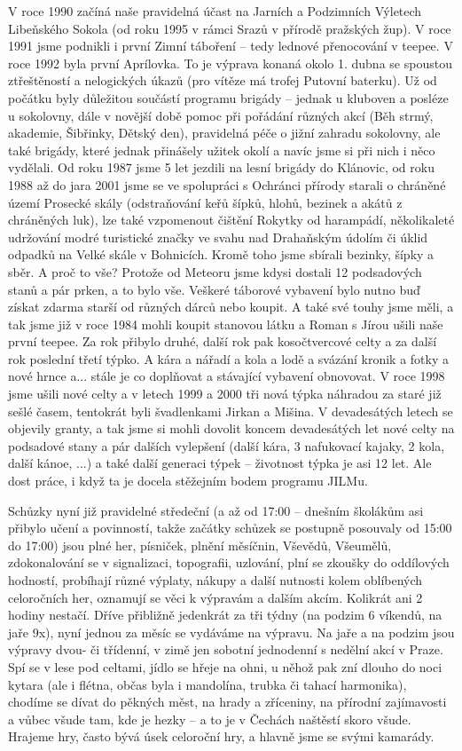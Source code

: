 V roce 1990 začíná naše pravidelná účast na Jarních a Podzimních
Výletech Libeňského Sokola (od roku 1995 v rámci Srazů v přírodě
pražských žup). V roce 1991 jsme podnikli i první Zimní táboření -- tedy
lednové přenocování v teepee. V roce 1992 byla první Aprílovka. To je
výprava konaná okolo 1. dubna se spoustou ztřeštěností a nelogických
úkazů (pro vítěze má trofej Putovní baterku). Už od počátku byly
důležitou součástí programu brigády -- jednak u kluboven a posléze u
sokolovny, dále v novější době pomoc při pořádání různých akcí (Běh
strmý, akademie, Šibřinky, Dětský den), pravidelná péče o jižní zahradu
sokolovny, ale také brigády, které jednak přinášely užitek okolí a navíc
jsme si při nich i něco vydělali. Od roku 1987 jsme 5 let jezdili na
lesní brigády do Klánovic, od roku 1988 až do jara 2001 jsme se ve
spolupráci s Ochránci přírody starali o chráněné území Prosecké skály
(odstraňování keřů šípků, hlohů, bezinek a akátů z chráněných luk), lze
také vzpomenout čištění Rokytky od harampádí, několikaleté udržování
modré turistické značky ve svahu nad Drahaňským údolím či úklid odpadků
na Velké skále v Bohnicích. Kromě toho jsme sbírali bezinky, šípky a
sběr. A proč to vše? Protože od Meteoru jsme kdysi dostali 12
podsadových stanů a pár prken, a to bylo vše. Veškeré táborové vybavení
bylo nutno buď získat zdarma starší od různých dárců nebo koupit. A také
své touhy jsme měli, a tak jsme již v roce 1984 mohli koupit stanovou
látku a Roman s Jírou ušili naše první teepee. Za rok přibylo druhé,
další rok pak kosočtvercové celty a za další rok poslední třetí týpko. A
kára a nářadí a kola a lodě a svázání kronik a fotky a nové hrnce a...
stále je co doplňovat a stávající vybavení obnovovat. V roce 1998 jsme
ušili nové celty a v letech 1999 a 2000 tři nová týpka náhradou za staré
již sešlé časem, tentokrát byli švadlenkami Jirkan a Mišina. V
devadesátých letech se objevily granty, a tak jsme si mohli dovolit
koncem devadesátých let nové celty na podsadové stany a pár dalších
vylepšení (další kára, 3 nafukovací kajaky, 2 kola, další kánoe, ...) a
také další generaci týpek -- životnost týpka je asi 12 let. Ale dost
práce, i když ta je docela stěžejním bodem programu JILMu.

Schůzky nyní již pravidelné středeční (a až od 17:00 -- dnešním školákům
asi přibylo učení a povinností, takže začátky schůzek se postupně
posouvaly od 15:00 do 17:00) jsou plné her, písniček, plnění měsíčnin,
Vševědů, Všeumělů, zdokonalování se v signalizaci, topografii, uzlování,
plní se zkoušky do oddílových hodností, probíhají různé výplaty, nákupy
a další nutnosti kolem oblíbených celoročních her, oznamují se věci k
výpravám a dalším akcím. Kolikrát ani 2 hodiny nestačí. Dříve přibližně
jedenkrát za tři týdny (na podzim 6 víkendů, na jaře 9x), nyní jednou za
měsíc se vydáváme na výpravu. Na jaře a na podzim jsou výpravy dvou- či
třídenní, v zimě jen sobotní jednodenní s nedělní akcí v Praze. Spí se v
lese pod celtami, jídlo se hřeje na ohni, u něhož pak zní dlouho do noci
kytara (ale i flétna, občas byla i mandolína, trubka či tahací
harmonika), chodíme se dívat do pěkných měst, na hrady a zříceniny, na
přírodní zajímavosti a vůbec všude tam, kde je hezky -- a to je v
Čechách naštěstí skoro všude. Hrajeme hry, často bývá úsek celoroční
hry, a hlavně jsme se svými kamarády.

